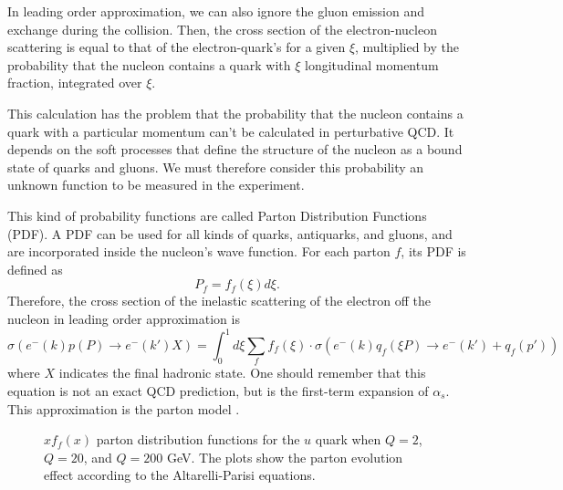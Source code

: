     In leading order approximation, we can also ignore the gluon emission and exchange during the collision.
    Then, the cross section of the electron-nucleon scattering is equal to that of the electron-quark's for a given $\xi$, multiplied by the probability that the nucleon contains a quark with $\xi$ longitudinal momentum fraction, integrated over $\xi$.

    This calculation has the problem that the probability that the nucleon contains a quark with a particular momentum can't be calculated in perturbative QCD.
    It depends on the soft processes that define the structure of the nucleon as a bound state of quarks and gluons.
    We must therefore consider this probability an unknown function to be measured in the experiment.

    This kind of probability functions are called Parton Distribution Functions (PDF).
    A PDF can be used for all kinds of quarks, antiquarks, and gluons, and are incorporated inside the nucleon's wave function.
    For each parton $f$, its PDF is defined as
    \begin{equation*}
        P_f = f_f(\xi)d\xi.
    \end{equation*}
    Therefore, the cross section of the inelastic scattering of the electron off the nucleon in leading order approximation is
    \begin{equation*}
        \sigma\left( e^-(k) p(P) \rightarrow e^-(k') X \right) =
                \int_0^1d\xi \sum_f f_f(\xi) \cdot
                \sigma\left( e^-(k) q_f(\xi P) \rightarrow e^-(k') + q_f(p') \right)
    \end{equation*}
    where $X$ indicates the final hadronic state.
    One should remember that this equation is not an exact QCD prediction, but is the first-term expansion of $\alpha_s$.
    This approximation is the parton model \cite{halzen1991}.

    \begin{figure}[b!] %
        \centering{}
        \caption[$Q^2$ dependence of $x$ PDF for the $u$ quark.]{$xf_f(x)$ parton distribution functions for the $u$ quark when $Q = 2$, $Q = 20$, and $Q = 200$ GeV.
        The plots show the parton evolution effect according to the Altarelli-Parisi equations.}
        \label{fig::q2dependenceu}
    \end{figure}

